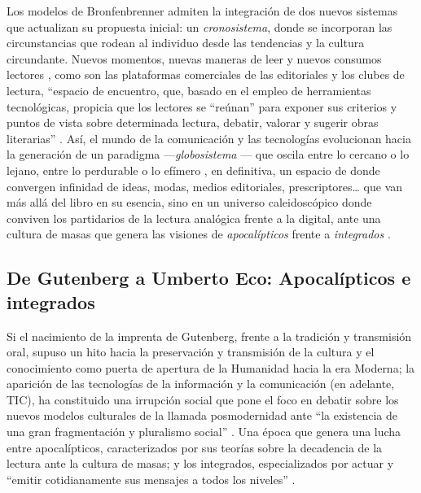 \documentclass[spanish]{textolivre}
\begin{document}
Los modelos de Bronfenbrenner admiten la integración de dos nuevos sistemas que actualizan su propuesta inicial: un \emph{cronosistema}, donde se incorporan las circunstancias que rodean al individuo desde las tendencias y la cultura circundante. Nuevos momentos, nuevas maneras de leer y nuevos consumos lectores \cite{tabernero2020reading}, como son las plataformas comerciales de las editoriales y los clubes de lectura, “espacio de encuentro, que, basado en el empleo de herramientas tecnológicas, propicia que los lectores se “reúnan” para exponer sus criterios y puntos de vista sobre determinada lectura, debatir, valorar y sugerir obras literarias” \cite[p.14]{manso2015leer}. Así, el mundo de la comunicación y las tecnologías evolucionan hacia la generación de un paradigma —\emph{globosistema} \cite{bronfenbrenner1996ecologia}— que oscila entre lo cercano o lo lejano, entre lo perdurable o lo efímero \cite{caride2015leer}, en definitiva, un espacio de donde convergen infinidad de ideas, modas, medios editoriales, prescriptores… que van más allá del libro en su esencia, sino en un universo caleidoscópico donde conviven los partidarios de la lectura analógica frente a la digital, ante una cultura de masas que genera las visiones de \emph{apocalípticos} frente a \emph{integrados} \cite{umbertoapocalípticos}.  


\subsection{De Gutenberg a Umberto Eco: Apocalípticos e integrados}
Si el nacimiento de la imprenta de Gutenberg, frente a la tradición y transmisión oral, supuso un hito hacia la preservación y transmisión de la cultura y el conocimiento como puerta de apertura de la Humanidad hacia la era Moderna; la aparición de las tecnologías de la información y la comunicación (en adelante, TIC), ha constituido una irrupción social que pone el foco en debatir sobre los nuevos modelos culturales de la llamada posmodernidad ante “la existencia de una gran fragmentación y pluralismo social” \cite[p.94]{hall1993hegemonia}. Una época que genera una lucha entre apocalípticos, caracterizados por sus teorías sobre la decadencia de la lectura ante la cultura de masas; y los integrados, especializados por actuar y “emitir cotidianamente sus mensajes a todos los niveles” \cite[p.31]{umbertoapocalípticos}. 
\end{document}
